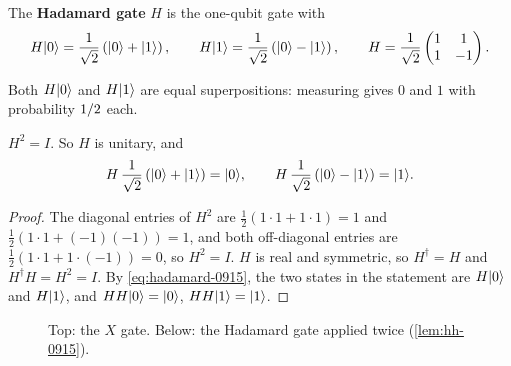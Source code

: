 \begin{definition}\label{def:hadamard-0915}
    The \textbf{Hadamard gate} $H$ is the one-qubit gate with
    \begin{equation}\label{eq:hadamard-0915}
        H \lvert 0 \rangle = \frac{1}{\sqrt{2}}\left(\lvert 0 \rangle + \lvert 1 \rangle\right),
        \qquad
        H \lvert 1 \rangle = \frac{1}{\sqrt{2}}\left(\lvert 0 \rangle - \lvert 1 \rangle\right),
        \qquad
        H = \frac{1}{\sqrt{2}} \begin{pmatrix} 1 & 1 \\ 1 & -1 \end{pmatrix}.
    \end{equation}
\end{definition}

Both $H \lvert 0 \rangle$ and $H \lvert 1 \rangle$ are equal superpositions: measuring gives $0$ and $1$ with
probability $1/2$ each.

\begin{lemma}\label{lem:hh-0915}
    $H^2 = I$. So $H$ is unitary, and
    \[H \, \frac{1}{\sqrt{2}}\left(\lvert 0 \rangle + \lvert 1 \rangle\right) = \lvert 0 \rangle,
        \qquad
        H \, \frac{1}{\sqrt{2}}\left(\lvert 0 \rangle - \lvert 1 \rangle\right) = \lvert 1 \rangle.\]
\end{lemma}

\begin{proof}
    The diagonal entries of $H^2$ are $\frac{1}{2}(1 \cdot 1 + 1 \cdot 1) = 1$
    and $\frac{1}{2}(1 \cdot 1 + (-1)(-1)) = 1$, and both off-diagonal entries are
    $\frac{1}{2}(1 \cdot 1 + 1 \cdot (-1)) = 0$, so $H^2 = I$.
    $H$ is real and symmetric, so $H^\dagger = H$ and $H^\dagger H = H^2 = I$.
    By \cref{eq:hadamard-0915}, the two states in the statement are $H \lvert 0 \rangle$ and $H \lvert 1 \rangle$, and
    $H H \lvert 0 \rangle = \lvert 0 \rangle$, $H H \lvert 1 \rangle = \lvert 1 \rangle$.
\end{proof}

\begin{figure}[ht]
    \centering
    \caption{Top: the $X$ gate. Below: the Hadamard gate applied twice (\cref{lem:hh-0915}).}
    \label{fig:xh-0915}
\end{figure}

